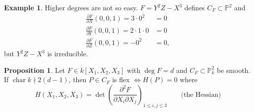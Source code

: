 \documentclass{article}
\newcommand{\p}{\mathbb{P}}
\newcommand{\Char}{\operatorname{char}}
\theoremstyle{definition}
\newtheorem{prop}[defn]{Proposition}
\newtheorem{example}[defn]{Example}
\begin{document}
\begin{example}
Higher degrees are not so easy. $F=Y^2Z-X^3$ defines $C_F\subset\p^2$ and
\[
\begin{aligned}
\frac{\partial F}{\partial X}(0,0,1)=3\cdot 0^2&=0 \\
\frac{\partial F}{\partial Y}(0,0,1)=2\cdot 1\cdot 0&=0\\
\frac{\partial F}{\partial Z}(0,0,1)=-0^2&=0,
\end{aligned}
\]
but $Y^2Z-X^3$ is irreducible.
\end{example}

\begin{prop}
\label{prop:flexHessian}
Let $F\in k[X_1,X_2,X_3]$ with $\deg F=d$ and $C_F\subset\p_k^2$ be smooth. If $\Char k\nmid 2(d-1)$, then $P\in C_F$ is flex $\iff H(P)=0$ where
\[
H(X_1,X_2,X_3)=\det\left(\frac{\partial^2 F}{\partial X_i\partial X_j}\right)_{1\leq i,j\leq 3} \qquad\text{(the Hessian)}
\]
\end{prop}

\begin{center}
\end{center}
\end{document}
